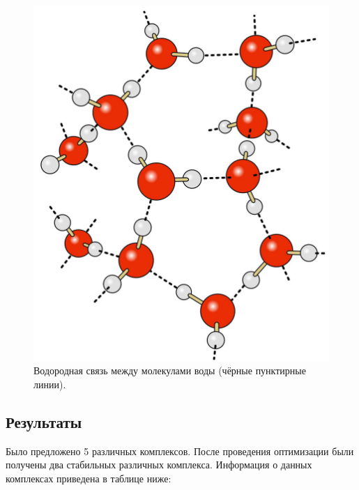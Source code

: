 \begin{figure}[H]
\centering
\captionsetup{justification=centering}
\includegraphics[scale=0.2]{fig/1.jpg}
\caption{Водородная связь между молекулами воды (чёрные пунктирные линии).}
\end{figure}


\subsection{Результаты}
Было предложено 5 различных комплексов. После проведения оптимизации были получены два стабильных различных комплекса. Информация о данных комплексах приведена в таблице ниже: 

